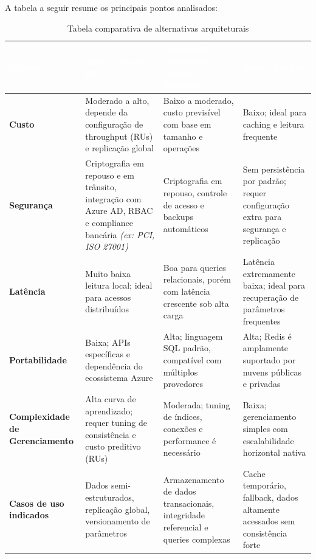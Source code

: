 A tabela a seguir resume os principais pontos analisados:

\begin{table}[h]
	\centering
	\caption{Tabela comparativa de alternativas arquiteturais}
	\label{tab:comparativo}
	\begin{tabular}{p{3.2cm}p{3.8cm}p{3.8cm}p{3.8cm}}
		\toprule
		\rowcolor{headerpurple}
		\textcolor{white}{\textbf{Critério}} & \textcolor{white}{\textbf{Azure Cosmos DB}} & \textcolor{white}{\textbf{PostgreSQL Gerenciado (Azure Database)}} & \textcolor{white}{\textbf{Redis (Cache)}} \\
		\midrule
		\textbf{Custo} & Moderado a alto, depende da configuração de throughput (RUs) e replicação global & Baixo a moderado, custo previsível com base em tamanho e operações & Baixo; ideal para caching e leitura frequente \\
		\rowcolor{lightpurple}
		\textbf{Segurança} & Criptografia em repouso e em trânsito, integração com Azure AD, RBAC e compliance bancária \textit{(ex: PCI, ISO 27001)} & Criptografia em repouso, controle de acesso e backups automáticos & Sem persistência por padrão; requer configuração extra para segurança e replicação \\
		\textbf{Latência} & Muito baixa leitura local; ideal para acessos distribuídos & Boa para queries relacionais, porém com latência crescente sob alta carga & Latência extremamente baixa; ideal para recuperação de parâmetros frequentes \\
		\rowcolor{lightpurple}
		\textbf{Portabilidade} & Baixa; APIs específicas e dependência do ecossistema Azure & Alta; linguagem SQL padrão, compatível com múltiplos provedores & Alta; Redis é amplamente suportado por nuvens públicas e privadas \\
		\textbf{Complexidade de Gerenciamento} & Alta curva de aprendizado; requer tuning de consistência e custo preditivo (RUs) & Moderada; tuning de índices, conexões e performance é necessário & Baixa; gerenciamento simples com escalabilidade horizontal nativa \\
		\rowcolor{lightpurple}
		\textbf{Casos de uso indicados} & Dados semi-estruturados, replicação global, versionamento de parâmetros & Armazenamento de dados transacionais, integridade referencial e queries complexas & Cache temporário, fallback, dados altamente acessados sem consistência forte \\
		\bottomrule
	\end{tabular}
\end{table}

